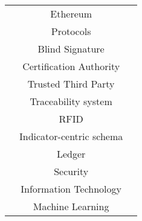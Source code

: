 \begin{longtable}{ |c|c|p{4cm}| }
	 & Ethereum & \\ \cline{2-3}
	 & Protocols & \cite{2016_Kianmajd} \\ \cline{2-3}
	 & Blind Signature & \multirow{3}{*}{\cite{2016_Schaub}} \\ \cline{2-2}
	 & Certification Authority & \\ \cline{2-2}
	 & Trusted Third Party & \\ \cline{2-3}
	 & Traceability system & \multirow{2}{*}{\cite{2016_Tian}} \\ \cline{2-2}
	 & RFID & \\ \cline{2-3}
	 & Indicator-centric schema & \cite{2016_Yue} \\ \cline{2-3}
	 & Ledger & \cite{2017_Coyne} \\ \cline{2-3}
	 & Security & \cite{2017_Ouaddah} \\ \cline{2-3}
	 & Information Technology & \multirow{2}{*}{\cite{2018_Alessandra}}\\ \cline{2-2}
	 & Machine Learning & \\
	 \hline
\end{longtable}

